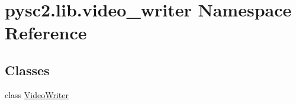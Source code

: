 \hypertarget{namespacepysc2_1_1lib_1_1video__writer}{}\section{pysc2.\+lib.\+video\+\_\+writer Namespace Reference}
\label{namespacepysc2_1_1lib_1_1video__writer}
\subsection*{Classes}
\begin{DoxyCompactItemize}
\item 
class \mbox{\hyperlink{classpysc2_1_1lib_1_1video__writer_1_1_video_writer}{Video\+Writer}}
\end{DoxyCompactItemize}
